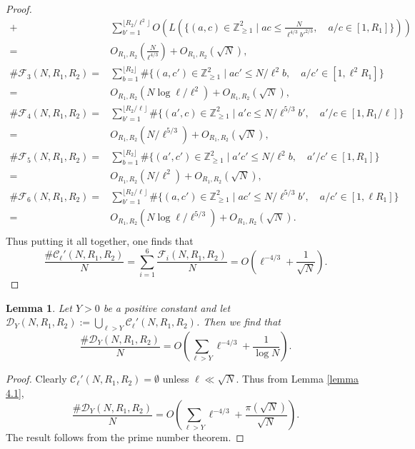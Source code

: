 \documentclass[table]{amsart}
\newtheorem{lemma}[theorem]{Lemma}
\newcommand{\cF}{\mathcal{F}}
\newcommand{\Z}{\mathbb{Z}}
\newcommand{\cC}{\mathcal{C}}
\numberwithin{equation}{section}
\begin{document}
\begin{proof}
\[\begin{split}
+ & \sum_{b'=1}^{\lfloor R_2/\ell^2\rfloor} O\left( L\left(\{(a,c)\in \Z_{\geq 1}^2\mid ac\leq \frac{N}{\ell^{4/3}b'^{2/3}},\quad a/c\in [1, R_1]\}\right)\right)\\
=& O_{R_1, R_2}\left(\frac{N}{\ell^{4/3}}\right) + O_{R_1, R_2}(\sqrt{N}), \\
\# \cF_3(N, R_1, R_2)=& \sum_{b=1}^{\lfloor R_2\rfloor} \# \{(a,c')\in \Z_{\geq 1}^2\mid ac'\leq N/\ell^2b,\quad a/c'\in [1, \ell^2 R_1]\}\\
=& O_{R_1, R_2}(N \log \ell/\ell^2)+ O_{R_1, R_2}(\sqrt{N}),\\
\# \cF_4(N, R_1, R_2)=& \sum_{b'=1}^{\lfloor R_2/\ell \rfloor} \# \{(a',c)\in \Z_{\geq 1}^2\mid a'c\leq N/\ell^{5/3}b',\quad a'/c\in [1,  R_1/\ell]\}\\
=& O_{R_1, R_2}(N /\ell^{5/3})+ O_{R_1, R_2}(\sqrt{N}),\\
\# \cF_5(N, R_1, R_2)=& \sum_{b=1}^{\lfloor R_2 \rfloor} \# \{(a',c')\in \Z_{\geq 1}^2\mid a'c'\leq N/\ell^{2}b,\quad a'/c'\in [1, R_1]\}\\
=& O_{R_1, R_2}(N /\ell^2)+ O_{R_1, R_2}(\sqrt{N}),\\ 
\# \cF_6(N, R_1, R_2)=& \sum_{b'=1}^{\lfloor R_2/\ell \rfloor} \# \{(a,c')\in \Z_{\geq 1}^2\mid ac'\leq N/\ell^{5/3} b',\quad a/c'\in [1, \ell R_1]\}\\
=& O_{R_1, R_2}\left(N \log \ell /\ell^{5/3}\right)+ O_{R_1, R_2}(\sqrt{N}).\\ 
\end{split}\]
Thus putting it all together, one finds that 
\[\frac{\# \cC_\ell'(N, R_1, R_2)}{N}=\sum_{i=1}^6 \frac{\cF_i(N, R_1, R_2)}{N}=O\left(\ell^{-4/3}+\frac{1}{\sqrt{N}}\right).\]
\end{proof}

\begin{lemma}
    Let $Y>0$ be a positive constant and let $\mathcal{D}_Y(N, R_1, R_2):=\bigcup_{\ell>Y} \cC_\ell'(N, R_1, R_2)$. Then we find that 
    \[\frac{\# \mathcal{D}_Y(N, R_1, R_2)}{N}=O\left(\sum_{\ell>Y} \ell^{-4/3}+ \frac{1}{\log N}\right).\]
\end{lemma}
\begin{proof}
    Clearly $\cC_\ell'(N, R_1, R_2)=\emptyset$ unless $\ell\ll \sqrt{N}$. Thus from Lemma \ref{lemma 4.1},
     \[\frac{\# \mathcal{D}_Y(N, R_1, R_2)}{N}=O\left(\sum_{\ell>Y} \ell^{-4/3}+ \frac{\pi(\sqrt{N})}{\sqrt{N}}\right).\]
    The result follows from the prime number theorem.
\end{proof}
\end{document}
